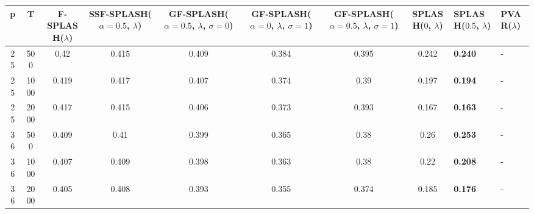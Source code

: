 \begin{tabular}{ccccccccll}
\hline
  p  &  T   &  F-SPLASH($\lambda$)  &  SSF-SPLASH($\alpha=0.5$, $\lambda$)  &  GF-SPLASH($\alpha=0.5$, $\lambda$, $\sigma=0$)  &  GF-SPLASH($\alpha=0$, $\lambda$, $\sigma=1$)  &  GF-SPLASH($\alpha=0.5$, $\lambda$, $\sigma=1$)  &  SPLASH($0$, $\lambda$)  & SPLASH($0.5$, $\lambda$)   & PVAR($\lambda$)   \\
\hline
 25  & 500  &         0.42          &                 0.415                 &                      0.409                       &                     0.384                      &                      0.395                       &          0.242           & \textbf{0.240}             & -                 \\
 25  & 1000 &         0.419         &                 0.417                 &                      0.407                       &                     0.374                      &                       0.39                       &          0.197           & \textbf{0.194}             & -                 \\
 25  & 2000 &         0.417         &                 0.415                 &                      0.406                       &                     0.373                      &                      0.393                       &          0.167           & \textbf{0.163}             & -                 \\
 36  & 500  &         0.409         &                 0.41                  &                      0.399                       &                     0.365                      &                       0.38                       &           0.26           & \textbf{0.253}             & -                 \\
 36  & 1000 &         0.407         &                 0.409                 &                      0.398                       &                     0.363                      &                       0.38                       &           0.22           & \textbf{0.208}             & -                 \\
 36  & 2000 &         0.405         &                 0.408                 &                      0.393                       &                     0.355                      &                      0.374                       &          0.185           & \textbf{0.176}             & -                 \\
\hline
\end{tabular}